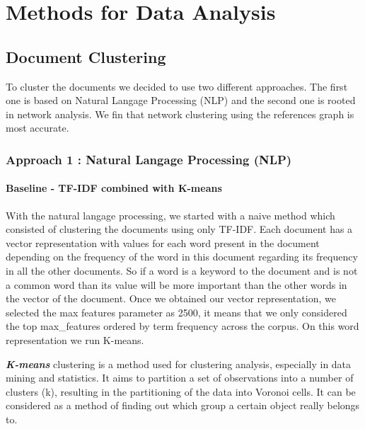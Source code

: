 \documentclass[article,twocolumn]{IEEEtran}
\begin{document}
    \hypertarget{methods-for-data-analysis}{%
\section{Methods for Data Analysis}\label{methods-for-data-analysis}}

    \hypertarget{document-clustering}{%
\subsection{Document Clustering}\label{document-clustering}}

To cluster the documents we decided to use two different approaches. The
first one is based on Natural Langage Processing (NLP) and the second
one is rooted in network analysis. We fin that network clustering using
the references graph is most accurate.

\hypertarget{approach-1-natural-langage-processing-nlp}{%
\subsubsection{Approach 1 : Natural Langage Processing
(NLP)}\label{approach-1-natural-langage-processing-nlp}}

\hypertarget{baseline---tf-idf-combined-with-k-means}{%
\paragraph{Baseline - TF-IDF combined with
K-means}\label{baseline---tf-idf-combined-with-k-means}}

With the natural langage processing, we started with a naive method
which consisted of clustering the documents using only TF-IDF. Each
document has a vector representation with values for each word present
in the document depending on the frequency of the word in this document
regarding its frequency in all the other documents. So if a word is a
keyword to the document and is not a common word than its value will be
more important than the other words in the vector of the document. Once
we obtained our vector representation, we selected the max features
parameter as 2500, it means that we only considered the top
max\_features ordered by term frequency across the corpus. On this word
representation we run K-means.

\textbf{\emph{K-means}} clustering is a method used for clustering
analysis, especially in data mining and statistics. It aims to partition
a set of observations into a number of clusters (k), resulting in the
partitioning of the data into Voronoi cells. It can be considered as a
method of finding out which group a certain object really belongs to.
\end{document}
